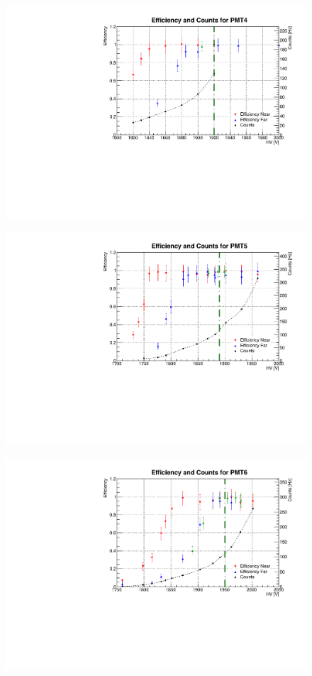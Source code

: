 \begin{figure}[h]
	\centerline{\includegraphics[scale=0.7]{img/eff4.pdf}}
\end{figure}
\begin{figure}[h]
	\centerline{\includegraphics[scale=0.7]{img/eff5.pdf}}
\end{figure}
\begin{figure}[h]
	\centerline{\includegraphics[scale=0.7]{img/eff6.pdf}}
\end{figure}
